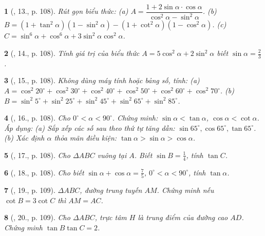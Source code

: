 \documentclass{article}
\newtheorem{baitoan}{}
\begin{document}
\begin{baitoan}[\cite{Tuyen_Toan_9_old}, 13., p. 108]
	Rút gọn biểu thức: (a) $A = \dfrac{1 + 2\sin\alpha\cdot\cos\alpha}{\cos^2\alpha - \sin^2\alpha}$. (b) $B = (1 + \tan^2\alpha)(1 - \sin^2\alpha) - (1 + \cot^2\alpha)(1 - \cos^2\alpha)$. (c) $C = \sin^6\alpha + \cos^6\alpha + 3\sin^2\alpha\cos^2\alpha$.
\end{baitoan}

\begin{baitoan}[\cite{Tuyen_Toan_9_old}, 14., p. 108]
	Tính giá trị của biểu thức $A = 5\cos^2\alpha + 2\sin^2\alpha$ biết $\sin\alpha = \frac{2}{3}$.
\end{baitoan}

\begin{baitoan}[\cite{Tuyen_Toan_9_old}, 15., p. 108]
	Không dùng máy tính hoặc bảng số, tính: (a) $A = \cos^2 20^\circ + \cos^2 30^\circ + \cos^2 40^\circ + \cos^2 50^\circ + \cos^2 60^\circ + \cos^2 70^\circ$. (b) $B = \sin^2 5^\circ + \sin^2 25^\circ + \sin^2 45^\circ + \sin^2 65^\circ + \sin^2 85^\circ$.
\end{baitoan}

\begin{baitoan}[\cite{Tuyen_Toan_9_old}, 16., p. 108]
	Cho $0^\circ < \alpha < 90^\circ$. Chứng minh: $\sin\alpha < \tan\alpha$, $\cos\alpha < \cot\alpha$. Áp dụng: (a) Sắp xếp các số sau theo thứ tự tăng dần: $\sin 65^\circ,\cos 65^\circ,\tan 65^\circ$. (b) Xác định $\alpha$ thỏa mãn điều kiện: $\tan\alpha > \sin\alpha > \cos\alpha$.
\end{baitoan}

\begin{baitoan}[\cite{Tuyen_Toan_9_old}, 17., p. 108]
	Cho $\Delta ABC$ vuông tại $A$. Biết $\sin B = \frac{1}{4}$, tính $\tan C$.
\end{baitoan}

\begin{baitoan}[\cite{Tuyen_Toan_9_old}, 18., p. 108]
	Cho biết $\sin\alpha + \cos\alpha = \frac{7}{5}$, $0^\circ < \alpha < 90^\circ$, tính $\tan\alpha$.
\end{baitoan}

\begin{baitoan}[\cite{Tuyen_Toan_9_old}, 19., p. 109]
	$\Delta ABC$, đường trung tuyến $AM$. Chứng minh nếu $\cot B = 3\cot C$ thì $AM = AC$.
\end{baitoan}

\begin{baitoan}[\cite{Tuyen_Toan_9_old}, 20., p. 109]
	Cho $\Delta ABC$, trực tâm $H$ là trung điểm của đường cao $AD$. Chứng minh $\tan B\tan C = 2$.
\end{baitoan}
\end{document}
